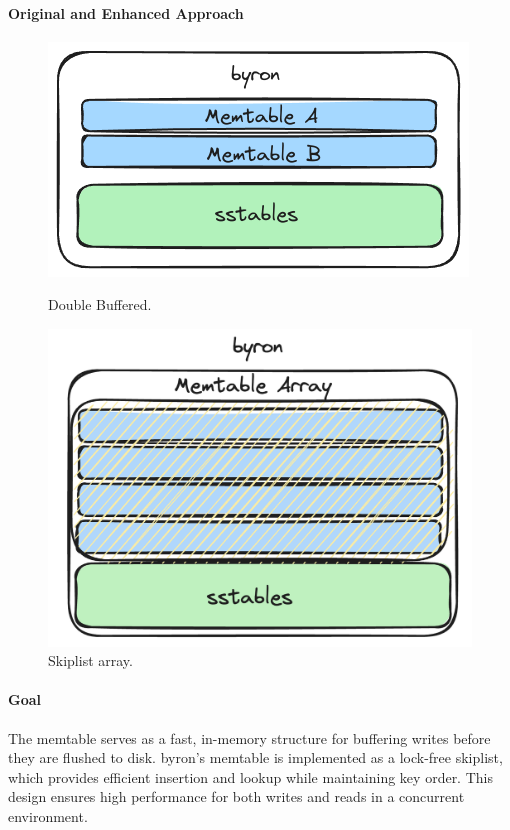 \documentclass[10pt]{article}
\begin{document}
\paragraph{Original and Enhanced Approach}
\begin{figure}[htbp]
  \centering
  \begin{minipage}{0.48\textwidth}
    \centering
    \includegraphics[width=\textwidth]{memtables.png}
    \caption{Double Buffered.}\label{fig:Double Buffered}
  \end{minipage}
  \hfill
  \begin{minipage}{0.48\textwidth}
    \centering
    \includegraphics[width=\textwidth, height=0.33\textheight]{memtable_array.png}
    \caption{Skiplist array.}\label{fig:Skiplist array}
  \end{minipage}
\end{figure}


\paragraph{Goal}
The memtable serves as a fast, in-memory structure for buffering writes before they are flushed to disk. byron’s memtable is implemented as a lock-free skiplist, which provides efficient insertion and lookup while maintaining key order. This design ensures high performance for both writes and reads in a concurrent environment.
\end{document}
